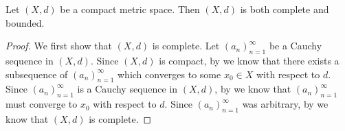 \begin{prop}\label{ii:1.5.5}
  Let \((X, d)\) be a compact metric space.
  Then \((X, d)\) is both complete and bounded.
\end{prop}

\begin{proof}
  We first show that \((X, d)\) is complete.
  Let \((a_n)_{n = 1}^\infty\) be a Cauchy sequence in \((X, d)\).
  Since \((X, d)\) is compact, by  we know that there exists a subsequence of \((a_n)_{n = 1}^\infty\) which converges to some \(x_0 \in X\) with respect to \(d\).
  Since \((a_n)_{n = 1}^\infty\) is a Cauchy sequence in \((X, d)\), by  we know that \((a_n)_{n = 1}^\infty\) must converge to \(x_0\) with respect to \(d\).
  Since \((a_n)_{n = 1}^\infty\) was arbitrary, by  we know that \((X, d)\) is complete.


\end{proof}
